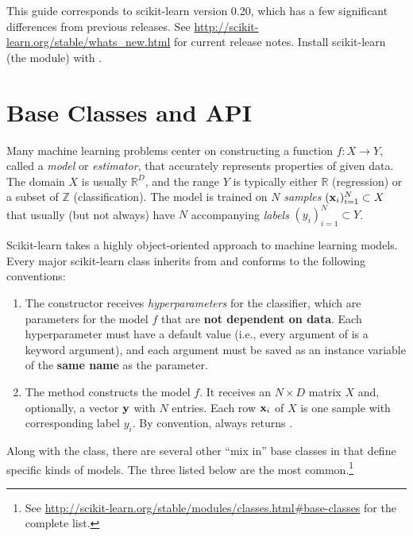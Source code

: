 
\begin{info}
This guide corresponds to scikit-learn version 0.20, which has a few significant differences from previous releases.
See \url{http://scikit-learn.org/stable/whats_new.html} for current release notes.
Install scikit-learn (the  module) with .
\end{info}


\section*{Base Classes and API} %

Many machine learning problems center on constructing a function $f:X\rightarrow Y$, called a \emph{model} or \emph{estimator}, that accurately represents properties of given data.
The domain $X$ is usually $\mathbb{R}^D$, and the range $Y$ is typically either $\mathbb{R}$ (regression) or a subset of $\mathbb{Z}$ (classification).
The model is trained on $N$ \emph{samples} $(\mathbf{x}_i)_{i=1}^N \subset X$ that usually (but not always) have $N$ accompanying \emph{labels} $(y_i)_{i=1}^N \subset Y$.

Scikit-learn \cite{scikit-learn,sklearn_api} takes a highly object-oriented approach to machine learning models.
Every major scikit-learn class inherits from  and conforms to the following conventions:

\begin{enumerate}
\item The constructor  receives \emph{hyperparameters} for the classifier, which are parameters for the model $f$ that are \textbf{not dependent on data}.
Each hyperparameter must have a default value (i.e., every argument of  is a keyword argument), and each argument must be saved as an instance variable of the \textbf{same name} as the parameter.

\item The  method constructs the model $f$.
It receives an $N\times D$ matrix $X$ and, optionally, a vector $\mathbf{y}$ with $N$ entries.
Each row $\mathbf{x}_i$ of $X$ is one sample with corresponding label $y_i$.
By convention,  always returns .
\end{enumerate}
%
Along with the  class, there are several other ``mix in'' base classes in  that define specific kinds of models.
The three listed below are the most common.\footnote{See \url{http://scikit-learn.org/stable/modules/classes.html\#base-classes} for the complete list.}

